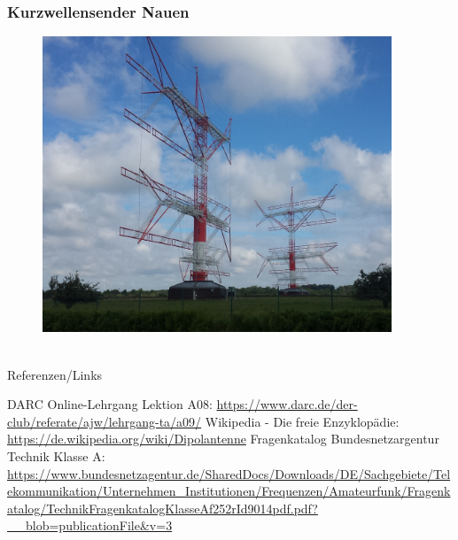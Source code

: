 \begin{frame}
  \frametitle{Kurzwellensender Nauen}
  \begin{center}
    \begin{figure}
      \includegraphics[width=0.93\textwidth,height=.75\textheight,keepaspectratio]{a09/Nauen_Dipolarray.jpg}
    \end{figure}
  \end{center}
\end{frame}



\renewcommand{\refname}{Referenzen}

\hypertarget{refs}{}
\textcolor{white}{} \\ %
\Large Referenzen/Links
\footnotesize

\begin{thebibliography}{}
    DARC Online-Lehrgang Lektion A08:
    \url{https://www.darc.de/der-club/referate/ajw/lehrgang-ta/a09/}
      Wikipedia - Die freie Enzyklopädie:
    \url{https://de.wikipedia.org/wiki/Dipolantenne}
     Fragenkatalog Bundesnetzargentur Technik Klasse A:
    \url{https://www.bundesnetzagentur.de/SharedDocs/Downloads/DE/Sachgebiete/Telekommunikation/Unternehmen_Institutionen/Frequenzen/Amateurfunk/Fragenkatalog/TechnikFragenkatalogKlasseAf252rId9014pdf.pdf?__blob=publicationFile&v=3}
\end{thebibliography}


